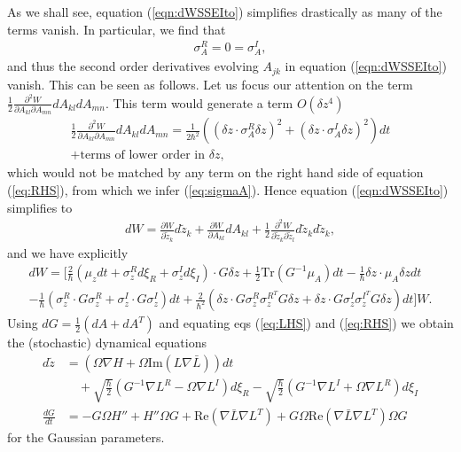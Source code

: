 \documentclass[12pt]{iopart} %
\begin{document}
As we shall see, equation (\ref{eqn:dWSSEIto}) simplifies drastically as many of the terms vanish. In particular, we find that 
\begin{equation}
\label{eq:sigmaA}
	\begin{aligned}
	\sigma_A^R=0=\sigma_A^I,
	\end{aligned}
\end{equation}
and thus the second order derivatives evolving $A_{jk}$ in equation (\ref{eqn:dWSSEIto}) vanish. This can be seen as follows. Let us focus our attention on the term $\frac12\frac{\partial^2 W}{\partial A_{kl}\partial A_{mn}} dA_{kl}dA_{mn}$. This term would generate a term $O(\delta z^4)$
\begin{multline}
	\frac12\frac{\partial^2 W}{\partial A_{kl}\partial A_{mn}} dA_{kl}dA_{mn} =\frac{1}{2\hbar^2}((\delta z \cdot \sigma_A^R \delta z)^2+(\delta z \cdot \sigma_A^I \delta z)^2)dt \\+\text{terms of lower order in $\delta z$},
\end{multline}	
which would not be matched by any term on the right hand side of equation (\ref{eq:RHS}), from which we infer (\ref{eq:sigmaA}). Hence equation (\ref{eqn:dWSSEIto}) simplifies to 
\begin{equation} 
	\begin{aligned}
	dW=\frac{\partial W}{\partial \tilde{z}_k} d\tilde{z}_k+\frac{\partial W}{\partial A_{kl}} dA_{kl} +\frac12\frac{\partial^2 W}{\partial \tilde{z}_k \partial \tilde{z}_l} d\tilde{z}_kd\tilde{z}_k,
	\end{aligned}
\end{equation}
and we have explicitly
\begin{multline} \label{eq:LHS}
	dW = [\frac{2}{\hbar}(\mu_z dt +\sigma_z^R d\xi_R+\sigma_z^I d\xi_I) \cdot G \delta z +\frac{1}{2 } \text{Tr}( G^{-1} \mu_A)dt  -\frac{1}{\hbar} \delta z \cdot \mu_A \delta z dt \\
	-\frac{1}{\hbar}(\sigma_z^R \cdot G \sigma_z^R+\sigma_z^I \cdot G \sigma_z^I) dt+\frac{2}{\hbar^2}(\delta z \cdot G \sigma_z^R\sigma_z^{R^T}G \delta z+\delta z \cdot G \sigma_z^I\sigma_z^{I^T}G \delta z)dt ]W	.
\end{multline}
Using $dG=\frac12(dA+dA^T)$ and equating eqs (\ref{eq:LHS}) and (\ref{eq:RHS}) we obtain the (stochastic) dynamical equations
\begin{align} 
	\nonumber d\tilde z &= \left(\Omega \nabla H+\Omega \text{Im}(L \nabla \bar{L})\right)dt\\ 
	&\quad +\sqrt{\frac{\hbar}{2}}( G^{-1} \nabla L^R- \Omega \nabla L^I) d\xi_R-\sqrt{\frac{\hbar}{2}}( G^{-1}\nabla L^I+ \Omega \nabla L^R)d\xi_I\label{eq:SSEParamz}\\
	\frac{d G}{dt}&=-G\Omega H''+H''\Omega G+\text{Re}(\nabla \bar L \nabla L^T)+G \Omega \text{Re}(\nabla \bar{L} \nabla L^T) \Omega G \label{eq:SSEParamG}
\end{align}
for the Gaussian parameters.
 
\end{document}
